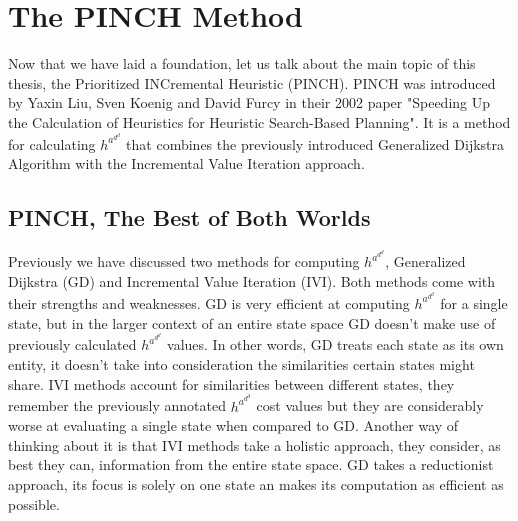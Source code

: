 \chapter{The PINCH Method}

Now that we have laid a foundation, let us talk about the main topic of this thesis, the Prioritized INCremental Heuristic (PINCH). PINCH was introduced by Yaxin Liu, Sven Koenig and David Furcy in their 2002 paper "Speeding Up the Calculation of Heuristics for Heuristic Search-Based Planning". It is a method for calculating $h^a^d^d$ that combines the previously introduced Generalized Dijkstra Algorithm with the Incremental Value Iteration approach.


\section{PINCH, The Best of Both Worlds}
\label{sec:my-label}

Previously we have discussed two methods for computing $h^a^d^d$, Generalized Dijkstra (GD) and Incremental Value Iteration (IVI). Both methods come with their strengths and weaknesses. GD is very efficient at computing $h^a^d^d$ for a single state, but in the larger context of an entire state space GD doesn't make use of previously calculated $h^a^d^d$ values. In other words, GD treats each state as its own entity, it doesn't take into consideration the similarities certain states might share. IVI methods account for similarities between different states, they remember the previously annotated $h^a^d^d$ cost values but they are considerably worse at evaluating a single state when compared to GD. Another way of thinking about it is that IVI methods take a holistic approach, they consider, as best they can, information from the entire state space. GD takes a reductionist approach, its focus is solely on one state an makes its computation as efficient as possible. \\

